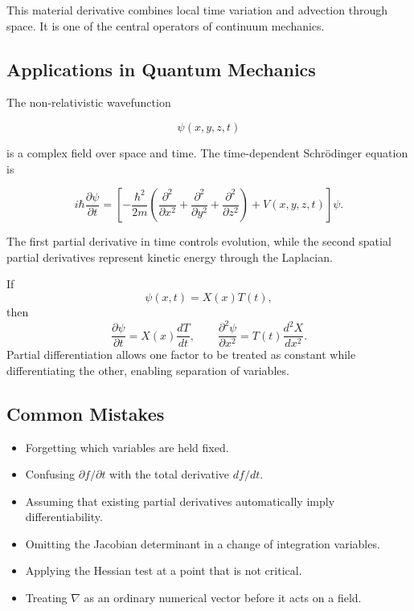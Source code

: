 This material derivative combines local time variation and advection through space. It is one of the central operators of continuum mechanics.

\subsection{Applications in Quantum Mechanics}

The non-relativistic wavefunction

\[
\psi(x,y,z,t)
\]

is a complex field over space and time. The time-dependent Schr\"odinger equation is

\begin{equation}
\boxed{
i\hbar\frac{\partial\psi}{\partial t}
=
\left[
-\frac{\hbar^2}{2m}
\left(
\frac{\partial^2}{\partial x^2}
+
\frac{\partial^2}{\partial y^2}
+
\frac{\partial^2}{\partial z^2}
\right)
+V(x,y,z,t)
\right]\psi.
}
\label{eq:schrodinger-partial-derivatives}
\end{equation}

The first partial derivative in time controls evolution, while the second spatial partial derivatives represent kinetic energy through the Laplacian.

\begin{bookexample}
If
\[
\psi(x,t)=X(x)T(t),
\]
then
\[
\frac{\partial\psi}{\partial t}=X(x)\frac{dT}{dt},
\qquad
\frac{\partial^2\psi}{\partial x^2}=T(t)\frac{d^2X}{dx^2}.
\]
Partial differentiation allows one factor to be treated as constant while differentiating the other, enabling separation of variables.
\end{bookexample}

\subsection{Common Mistakes}

\begin{bookwarning}
\begin{itemize}
\item Forgetting which variables are held fixed.
\item Confusing $\partial f/\partial t$ with the total derivative $df/dt$.
\item Assuming that existing partial derivatives automatically imply differentiability.
\item Omitting the Jacobian determinant in a change of integration variables.
\item Applying the Hessian test at a point that is not critical.
\item Treating $\nabla$ as an ordinary numerical vector before it acts on a field.
\end{itemize}
\end{bookwarning}

